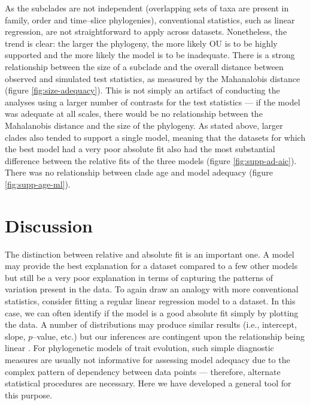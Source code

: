 \documentclass[a4paper,11pt]{article}
\begin{document}
As the subclades are not independent (overlapping sets of taxa are present in family, order and time--slice phylogenies), conventional statistics, such as linear regression, are not straightforward to apply across datasets. Nonetheless, the trend is clear: the larger the phylogeny, the more likely OU is to be highly supported and the more likely the model is to be inadequate. There is a strong relationship between the size of a subclade and the overall distance between observed and simulated test statistics, as measured by the Mahanalobis distance (figure \ref{fig:size-adequacy}). This is not simply an artifact of conducting the analyses using a larger number of contrasts for the test statistics --- if the model was adequate at all scales, there would be no relationship between the Mahalanobis distance and the size of the phylogeny. As stated above, larger clades also tended to support a single model, meaning that the datasets for which the best model had a very poor absolute fit also had the most substantial difference between the relative fits of the three models (figure \ref{fig:supp-ad-aic}). There was no relationship between clade age and model adequacy (figure \ref{fig:supp-age-ml}).

\section{Discussion}

The distinction between relative and absolute fit is an important one. A model may provide the best explanation for a dataset compared to a few other models but still be a very poor explanation in terms of capturing the patterns of variation present in the data. To again draw an analogy with more conventional statistics, consider fitting a regular linear regression model to a dataset. In this case, we can often identify if the model is a good absolute fit simply by plotting the data. A number of distributions may produce similar results (i.e., intercept, slope, $p$--value, etc.) but our inferences are contingent upon the relationship being linear \citep[for a classic case study, see][]{anscombe1973}. For phylogenetic models of trait evolution, such simple diagnostic measures are usually not informative for assessing model adequacy due to the complex pattern of dependency between data points --- therefore, alternate statistical procedures are necessary. Here we have developed a general tool for this purpose. 
\end{document}
